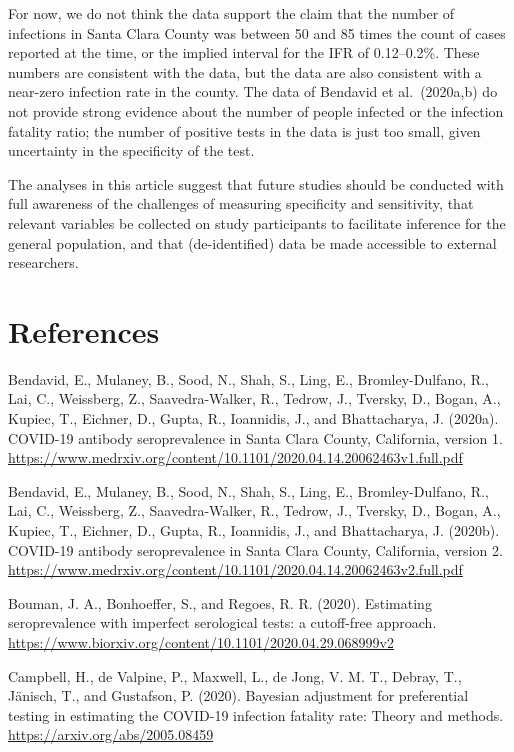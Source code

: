 \documentclass[11pt]{article}
\begin{document}
For now, we do not think the data support the claim that the number of
infections in Santa Clara County was between 50 and 85 times the count
of cases reported at the time, or the implied interval for the IFR of
0.12--0.2\%.  These numbers are consistent with the data, but the data
are also consistent with a near-zero infection rate in the county.
The data of Bendavid et al.\ (2020a,b) do not provide strong evidence
about the number of people infected or the infection fatality ratio;
the number of positive tests in the data is just too small, given
uncertainty in the specificity of the test.

The analyses in this article suggest that future studies should be
conducted with full awareness of the challenges of measuring
specificity and sensitivity, that relevant variables be collected on
study participants to facilitate inference for the general population,
and that (de-identified) data be made accessible to external
researchers.


\section*{References}

\noindent

\bibitem Bendavid, E., Mulaney, B., Sood, N., Shah, S., Ling, E.,
  Bromley-Dulfano, R., Lai, C., Weissberg, Z., Saavedra-Walker, R.,
  Tedrow, J., Tversky, D., Bogan, A., Kupiec, T., Eichner, D., Gupta,
  R., Ioannidis, J., and Bhattacharya, J. (2020a).  COVID-19 antibody
  seroprevalence in Santa Clara County, California, version 1. {\small
    \url{https://www.medrxiv.org/content/10.1101/2020.04.14.20062463v1.full.pdf}}

\bibitem Bendavid, E., Mulaney, B., Sood, N., Shah, S., Ling, E.,
  Bromley-Dulfano, R., Lai, C., Weissberg, Z., Saavedra-Walker, R.,
  Tedrow, J., Tversky, D., Bogan, A., Kupiec, T., Eichner, D., Gupta,
  R., Ioannidis, J., and Bhattacharya, J. (2020b).  COVID-19 antibody
  seroprevalence in Santa Clara County, California, version 2. {\small
    \url{https://www.medrxiv.org/content/10.1101/2020.04.14.20062463v2.full.pdf}}

\bibitem Bouman, J. A., Bonhoeffer, S., and Regoes, R. R.  (2020).
  Estimating seroprevalence with imperfect serological tests: a
  cutoff-free approach.  {\small
    \url{https://www.biorxiv.org/content/10.1101/2020.04.29.068999v2}}

\bibitem Campbell, H., de Valpine, P., Maxwell, L., de Jong, V. M. T.,
  Debray, T., Jänisch, T., and Gustafson, P. (2020).  Bayesian
  adjustment for preferential testing in estimating the COVID-19
  infection fatality rate: Theory and methods.  {\small
    \url{https://arxiv.org/abs/2005.08459}}
\end{document}
